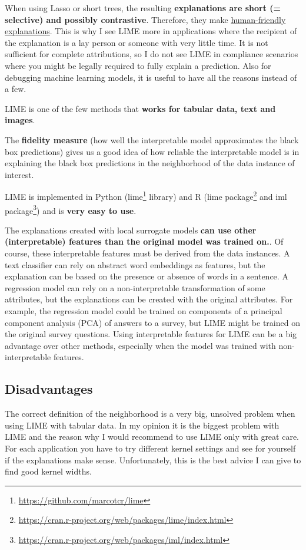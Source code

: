 \documentclass[
  11pt,
]{scrbook}
\renewcommand{\href}[2]{#2\footnote{\url{#1}}}
\begin{document}
When using Lasso or short trees, the resulting \textbf{explanations are short (= selective) and possibly contrastive}.
Therefore, they make \protect\hyperlink{explanation}{human-friendly explanations}.
This is why I see LIME more in applications where the recipient of the explanation is a lay person or someone with very little time.
It is not sufficient for complete attributions, so I do not see LIME in compliance scenarios where you might be legally required to fully explain a prediction.
Also for debugging machine learning models, it is useful to have all the reasons instead of a few.

LIME is one of the few methods that \textbf{works for tabular data, text and images}.

The \textbf{fidelity measure} (how well the interpretable model approximates the black box predictions) gives us a good idea of how reliable the interpretable model is in explaining the black box predictions in the neighborhood of the data instance of interest.

LIME is implemented in Python (\href{https://github.com/marcotcr/lime}{lime} library) and R (\href{https://cran.r-project.org/web/packages/lime/index.html}{lime package} and \href{https://cran.r-project.org/web/packages/iml/index.html}{iml package}) and is \textbf{very easy to use}.

The explanations created with local surrogate models \textbf{can use other (interpretable) features than the original model was trained on.}.
Of course, these interpretable features must be derived from the data instances.
A text classifier can rely on abstract word embeddings as features, but the explanation can be based on the presence or absence of words in a sentence.
A regression model can rely on a non-interpretable transformation of some attributes, but the explanations can be created with the original attributes.
For example, the regression model could be trained on components of a principal component analysis (PCA) of answers to a survey, but LIME might be trained on the original survey questions.
Using interpretable features for LIME can be a big advantage over other methods, especially when the model was trained with non-interpretable features.

\hypertarget{disadvantages-13}{%
\subsection{Disadvantages}\label{disadvantages-13}}

The correct definition of the neighborhood is a very big, unsolved problem when using LIME with tabular data.
In my opinion it is the biggest problem with LIME and the reason why I would recommend to use LIME only with great care.
For each application you have to try different kernel settings and see for yourself if the explanations make sense.
Unfortunately, this is the best advice I can give to find good kernel widths.
\end{document}
